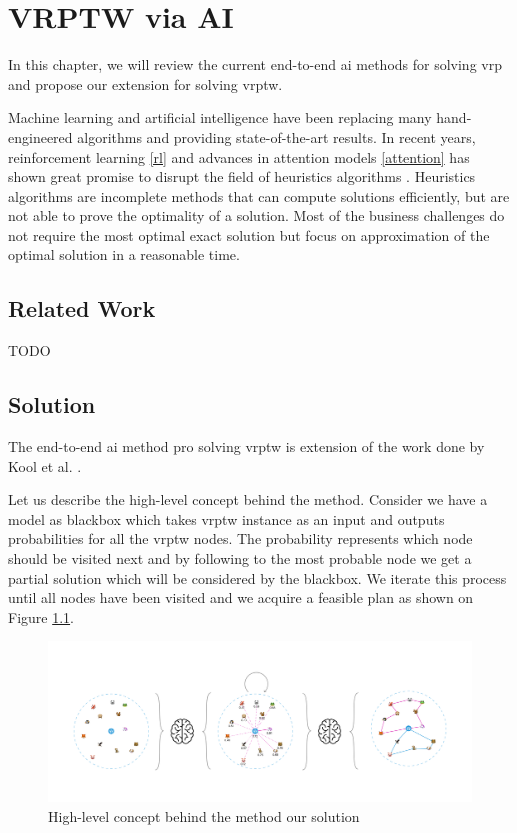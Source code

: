 \chapter{VRPTW via AI}
In this chapter, we will review the current end-to-end \gls{ai} methods for solving \gls{vrp} and propose our extension for solving \gls{vrptw}.

Machine learning and artificial intelligence have been replacing many hand-engineered algorithms and providing state-of-the-art results. In recent years, reinforcement learning \ref{rl} and advances in attention models \ref{attention} has shown great promise to disrupt the field of heuristics algorithms \cite{rl-constraint-opt, attention-route, dpdp}. Heuristics algorithms \cite{heuristics-algo} are incomplete methods that can compute solutions efficiently, but are not able to prove the optimality of a solution. Most of the business challenges do not require the most optimal exact solution \cite{excat-algo} but focus on approximation of the optimal solution in a reasonable time.

\section{Related Work}
TODO

\section{Solution}
The end-to-end \gls{ai} method pro solving \gls{vrptw} is extension of the work done by Kool et al. \cite{attention-route}. 

Let us describe the high-level concept behind the method. Consider we have a model as blackbox which takes \gls{vrptw} instance as an input and outputs probabilities for all the \gls{vrptw} nodes. The probability represents which node should be visited next and by following to the most probable node we get a partial solution which will be considered by the blackbox. We iterate this process until all nodes have been visited and we acquire a feasible plan as shown on Figure \ref{fig:attention-route-diagram}.

    \begin{figure}[ht]
        \centering
        \includegraphics[width=1.0\textwidth]{resources/vrptw-ai/attention-route-diagram.png}
        \caption{High-level concept behind the method our solution}
        \label{fig:attention-route-diagram}
    \end{figure}

